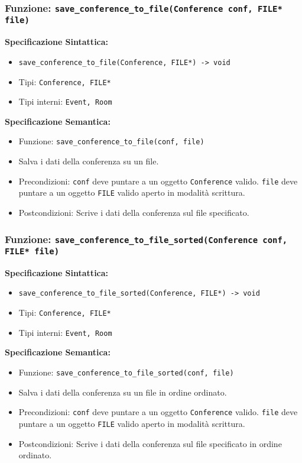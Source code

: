 \documentclass[11pt]{scrartcl} %
\begin{document}
\subsubsection{Funzione: \texttt{save\_conference\_to\_file(Conference conf, FILE* file)}}

\textbf{Specificazione Sintattica:}
\begin{itemize}
\item \texttt{save\_conference\_to\_file(Conference, FILE*) -> void}
\item Tipi: \texttt{Conference, FILE*}
\item Tipi interni: \texttt{Event, Room}
\end{itemize}

\textbf{Specificazione Semantica:}
\begin{itemize}
\item Funzione: \texttt{save\_conference\_to\_file(conf, file)}
\item Salva i dati della conferenza su un file.
\item Precondizioni: \texttt{conf} deve puntare a un oggetto \texttt{Conference} valido. \texttt{file} deve puntare a un oggetto \texttt{FILE} valido aperto in modalità scrittura.
\item Postcondizioni: Scrive i dati della conferenza sul file specificato.
\end{itemize}

\subsubsection{Funzione: \texttt{save\_conference\_to\_file\_sorted(Conference conf, FILE* file)}}

\textbf{Specificazione Sintattica:}
\begin{itemize}
\item \texttt{save\_conference\_to\_file\_sorted(Conference, FILE*) -> void}
\item Tipi: \texttt{Conference, FILE*}
\item Tipi interni: \texttt{Event, Room}
\end{itemize}

\textbf{Specificazione Semantica:}
\begin{itemize}
\item Funzione: \texttt{save\_conference\_to\_file\_sorted(conf, file)}
\item Salva i dati della conferenza su un file in ordine ordinato.
\item Precondizioni: \texttt{conf} deve puntare a un oggetto \texttt{Conference} valido. \texttt{file} deve puntare a un oggetto \texttt{FILE} valido aperto in modalità scrittura.
\item Postcondizioni: Scrive i dati della conferenza sul file specificato in ordine ordinato.
\end{itemize}
\end{document}
